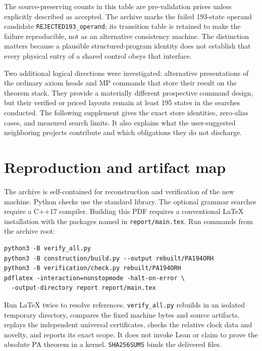 \documentclass[11pt,a4paper]{article}
\theoremstyle{definition}
\newcommand{\file}[1]{\nolinkurl{#1}}
\begin{document}
The source-preserving counts in this table are pre-validation prices
unless explicitly described as accepted. The archive marks the failed
193-state operand candidate \file{REJECTED193_operand}; its transition
table is retained to make the failure reproducible, not as an alternative
consistency machine. The distinction matters because a plausible
structured-program identity does not establish that every physical
entry of a shared control obeys that interface.

Two additional logical directions were investigated: alternative
presentations of the ordinary axiom heads and MP commands that store
their result on the theorem stack. They provide a materially different
prospective command design, but their verified or priced layouts remain
at least 195 states in the searches conducted. The following supplement
gives the exact store identities, zero-alias cases, and measured search
limits. It also explains what the user-suggested neighboring projects
contribute and which obligations they do not discharge.



\section{Reproduction and artifact map}

The archive is self-contained for reconstruction and verification of the
new machine. Python checks use the standard library. The optional
grammar searches require a C++17 compiler. Building this PDF requires
a conventional LaTeX installation with the packages named in
\file{report/main.tex}. Run commands from the archive root:
\par\noindent\begin{minipage}{\textwidth}
\begin{verbatim}
python3 -B verify_all.py
python3 -B construction/build.py --output rebuilt/PA194ORH
python3 -B verification/check.py rebuilt/PA194ORH
pdflatex -interaction=nonstopmode -halt-on-error \
  -output-directory report report/main.tex
\end{verbatim}
\end{minipage}\par
Run LaTeX twice to resolve references. \file{verify_all.py} rebuilds in
an isolated temporary directory, compares the fixed machine bytes and
source artifacts, replays the independent universal certificates, checks
the relative clock data and novelty, and reports its exact scope. It
does not invoke Lean or claim to prove the absolute PA theorem in a
kernel. \file{SHA256SUMS} binds the delivered files.
\end{document}

